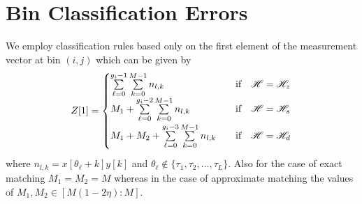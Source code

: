 

\section{Bin Classification Errors}
\label{Append:BinClassif}
We employ classification rules based only on the first element of the measurement vector at bin $(i,j)$ which can be given by
\begin{align}
Z[1]=\begin{cases}
\sum\limits_{\ell=0}^{g_{i}-1}\sum\limits_{k=0}^{M-1} n_{l,k}  & ~~\text{ if } ~~ \msc{H}=\msc{H}_z\label{Eqn:BinCombination}\\
\vspace{\vgap}
M_1+\sum\limits_{\ell=0}^{g_{i}-2}\sum\limits_{k=0}^{M-1} n_{l,k}  & ~~\text{ if } ~~ \msc{H}=\msc{H}_s\\
\vspace{\vgap}
M_1+M_2+\sum\limits_{\ell=0}^{g_{i}-3}\sum\limits_{k=0}^{M-1} n_{l,k}  & ~~\text{ if } ~~ \msc{H}=\msc{H}_d\\
\end{cases}
\end{align}
where $n_{l,k}=x[\theta_{\ell}+k]y[k]$ and $\theta_{\ell}\notin\{\tau_1,\tau_2,\ldots,\tau_L\}$. Also for the case of exact matching $M_1=M_2=M$ whereas in the case of approximate matching the values of $M_1,M_2\in[M(1-2\eta):M]$.

